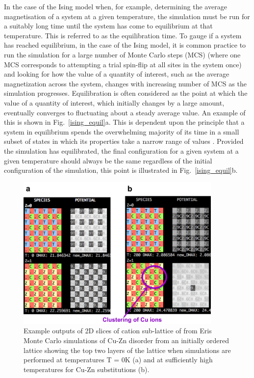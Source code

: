 \documentclass[11pt, twoside]{report}
\begin{document}
In the case of the Ising model when, for example, determining the average magnetisation of a system at a given temperature, the simulation must be run for a suitably long time until the system has come to equilibrium at that temperature. This is referred to as the equilibration time. 
To gauge if a system has reached equilibrium, in the case of the Ising model, it is common practice to run the simulation for a large number of Monte Carlo steps (MCS) (where one MCS corresponds to attempting a trial spin-flip at all sites in the system once) and looking for how the value of a quantity of interest, such as the average magnetization across the system, changes with increasing number of MCS as the simulation progresses. Equilibration is often considered as the point at which the value of a quantity of interest, which initially changes by a large amount, eventually converges to fluctuating about a steady average value. An example of this is shown in Fig.~\ref{ising_equil}a. This is dependent upon the principle that a system in equilibrium spends the overwhelming majority of its time in a small subset of states in which its properties take a narrow range of values \cite{MC}. Provided the simulation has equilibrated, the final configuration for a given system at a given temperature should always be the same regardless of the initial configuration of the simulation, this point is illustrated in Fig.~\ref{ising_equil}b.

\begin{figure}[h!]
  \centering
    \includegraphics[width=0.9\textwidth]{figures/eris_spatial_disorder.png}
    \caption{Example outputs of 2D slices of cation sub-lattice of {\CZTS} from Eris Monte Carlo simulations of Cu-Zn disorder from an initially ordered lattice showing the top two layers of the lattice when simulations are performed at temperatures T = 0K (a) and at sufficiently high temperatures for Cu-Zn substitutions (b).}
  \label{eris_spatial_disorder}
\end{figure}
\end{document}
